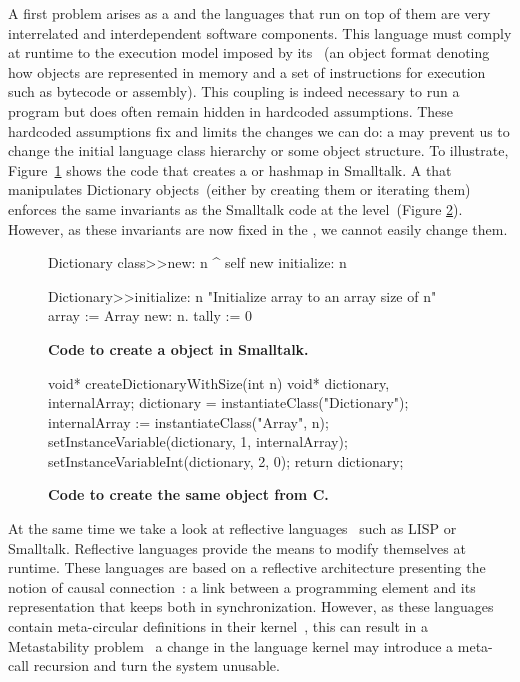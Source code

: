A first problem arises as a \VM and the languages that run on top of them are very interrelated and interdependent software components. 
This language must comply at runtime to the execution model imposed by its \VM~(\eg an object format denoting how objects are represented in memory and a set of instructions for execution such as bytecode or assembly). This coupling is indeed necessary to run a program but does often remain hidden in hardcoded assumptions. These hardcoded \VM assumptions fix and limits the changes we can do: a \VM may prevent us to change the initial language class hierarchy or some object structure. To illustrate, Figure~\ref{code:logic_dup} shows the code that creates a  or hashmap in Smalltalk. A \VM that manipulates Dictionary objects~(either by creating them or iterating them) enforces the same invariants as the Smalltalk code at the \VM level~(Figure \ref{code:logic_dup2}). However, as these invariants are now fixed in the \VM, we cannot easily change them.

\begin{figure}[ht]
\small
\begin{code}
Dictionary class>>new: n
    ^ self new initialize: n

Dictionary>>initialize: n
    "Initialize array to an array size of n"
    array := Array new: n.
    tally := 0
\end{code}
\caption{\textbf{Code to create a  object in Smalltalk.}\label{code:logic_dup}}
\end{figure}

\begin{figure}[ht]
\small
\begin{code}
void* createDictionaryWithSize(int n){
    void* dictionary, internalArray;
    dictionary = instantiateClass("Dictionary");
    internalArray := instantiateClass("Array", n);
    setInstanceVariable(dictionary, 1, internalArray);
    setInstanceVariableInt(dictionary, 2, 0);
    return dictionary;
}
\end{code}
\caption{\textbf{Code to create the same  object from C.}\label{code:logic_dup2}}
\end{figure}

At the same time we take a look at reflective languages~\cite{Smit84a} such as LISP or Smalltalk. Reflective languages provide the means to modify themselves at runtime. These languages are based on a reflective architecture presenting the notion of causal connection~\cite{Maes87a}: a link between a programming element and its representation that keeps both in synchronization. However, as these languages contain meta-circular definitions in their kernel~\cite{Chib96a}, this can result in a Metastability problem~\cite{Kicz91a} \ie a change in the language kernel may introduce a meta-call recursion and turn the system unusable.

